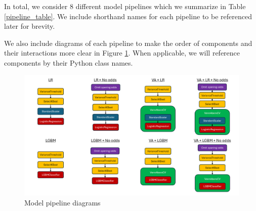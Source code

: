 \documentclass[12pt,twoside]{report}
\begin{document}
In total, we consider 8 different model pipelines which we summarize in Table \ref{pipeline_table}. We include shorthand names for each pipeline to be referenced later for brevity.

\begin{table}[!htb]
\centering
\caption{Summary table of model pipelines}
\label{pipeline_table}
\end{table}

We also include diagrams of each pipeline to make the order of components and their interactions more clear in Figure \ref{pipeline_diagrams}. When applicable, we will reference components by their Python class names.

\begin{figure}[!htb]
    \centering
    \includegraphics[width=\linewidth]{figures/pipeline_diagrams.png}
    \caption{Model pipeline diagrams}
    \label{pipeline_diagrams}
\end{figure}
\end{document}
